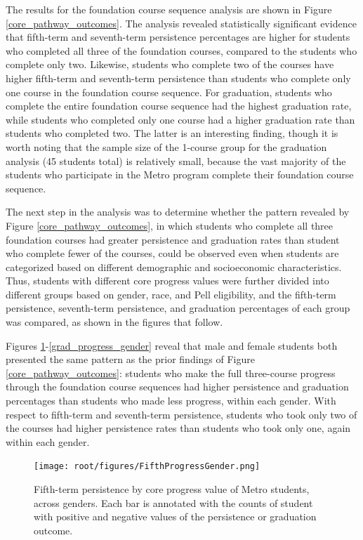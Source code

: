 The results for the foundation course sequence analysis are shown in Figure \ref{core_pathway_outcomes}.  The analysis revealed statistically significant evidence that fifth-term and seventh-term persistence percentages are higher for students who completed all three of the foundation courses, compared to the students who complete only two.  Likewise, students who complete two of the courses have higher fifth-term and seventh-term persistence than students who complete only one course in the foundation course sequence.  For graduation, students who complete the entire foundation course sequence had the highest graduation rate, while students who completed only one course had a higher graduation rate than students who completed two.  The latter is an interesting finding, though it is worth noting that the sample size of the 1-course group for the graduation analysis (45 students total) is relatively small, because the vast majority of the students who participate in the Metro program complete their foundation course sequence.  

The next step in the analysis was to determine whether the pattern revealed by Figure \ref{core_pathway_outcomes}, in which students who complete all three foundation courses had greater persistence and graduation rates than student who complete fewer of the courses, could be observed even when students are categorized based on different demographic and socioeconomic characteristics.  Thus, students with different core progress values were further divided into different groups based on gender, race, and Pell eligibility, and the fifth-term persistence, seventh-term persistence, and graduation percentages of each group was compared, as shown in the figures that follow.

Figures \ref{fifth_progress_gender}-\ref{grad_progress_gender} reveal that male and female students both presented the same pattern as the prior findings of Figure \ref{core_pathway_outcomes}: students who make the full three-course progress through the foundation course sequences had higher persistence and graduation percentages than students who made less progress, within each gender.  With respect to fifth-term and seventh-term persistence, students who took only two of the courses had higher persistence rates than students who took only one, again within each gender.  

\begin{figure}[htbp]
\centering
\texttt{[image: root/figures/FifthProgressGender.png]}
\caption{Fifth-term persistence by core progress value of Metro students, across genders.  Each bar is annotated with the counts of student with positive and negative values of the persistence or graduation outcome.}
\label{fifth_progress_gender}
\end{figure}

